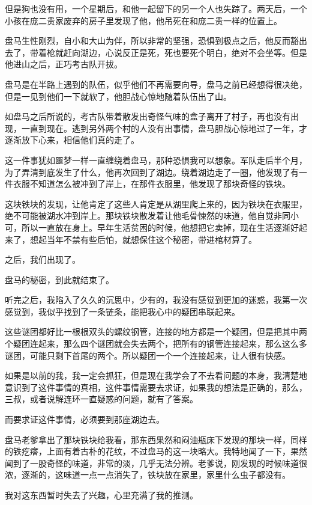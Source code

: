 但是狗也没有用，一个星期后，和他一起留下的另一个人也失踪了。两天后，一个小孩在庞二贵家废弃的房子里发现了他，他吊死在和庞二贵一样的位置上。

盘马生性刚烈，自小和大山为伴，所以非常的坚强，恐惧到极点之后，他反而豁出去了，带着枪就赶向湖边，心说反正是死，死也要死个明白，绝对不会坐等。但是他进山之后，正巧考古队开拔。

盘马是在半路上遇到的队伍，似乎他们不再需要向导，盘马之前已经想得很决绝，但是一见到他们一下就软了，他胆战心惊地随着队伍出了山。

如盘马之后所说的，考古队带着散发出奇怪气味的盒子离开了村子，再也没有出现，一直到现在。逃到另外两个村的人没有出事情，盘马胆战心惊地过了一年，才逐渐放下心来，相信他们真的走了。

这一件事犹如噩梦一样一直缠绕着盘马，那种恐惧我可以想象。军队走后半个月，为了弄清到底发生了什么，他再次回到了湖边。绕着湖边走了一圈，他发现了有一件衣服不知道怎么被冲到了岸上，在那件衣服里，他发现了那块奇怪的铁块。

这块铁块的发现，让他肯定了这些人肯定是从湖里爬上来的，因为铁块在衣服里，绝不可能被湖水冲到岸上。那块铁块散发着让他毛骨悚然的味道，他自觉非同小可，所以一直放在身上。早年生活贫困的时候，他想把它卖掉，现在生活逐渐好起来了，想起当年不禁有些后怕，就想保住这个秘密，带进棺材算了。

之后，我们出现了。

盘马的秘密，到此就结束了。

听完之后，我陷入了久久的沉思中，少有的，我没有感觉到更加的迷惑，我第一次感觉到，我似乎找到了一条链条，能把我心中的疑团串联起来。

这些谜团都好比一根根双头的螺纹钢管，连接的地方都是一个疑团，但是把其中两个疑团连起来，那么四个谜团就会失去两个，把所有的钢管连接起来，那么这么多谜团，可能只剩下首尾的两个。所以疑团一个一个连接起来，让人很有快感。

如果是以前的我，我一定会抓狂，但是现在我学会了不去看问题的本身，我清楚地意识到了这件事情的真相，这件事情需要去求证，如果我的想法是正确的，那么，三叔，或者说解连环一直疑惑的问题，就有了答案。

而要求证这件事情，必须要到那座湖边去。

盘马老爹拿出了那块铁块给我看，那东西果然和闷油瓶床下发现的那块一样，同样的铁疙瘩，上面有着古朴的花纹，不过盘马的这一块略大。我特地闻了一下，果然闻到了一股奇怪的味道，非常的淡，几乎无法分辨。老爹说，刚发现的时候味道很浓，逐渐的，这味道一点一点消失了，铁块放在家里，家里什么虫子都没有。

我对这东西暂时失去了兴趣，心里充满了我的推测。

